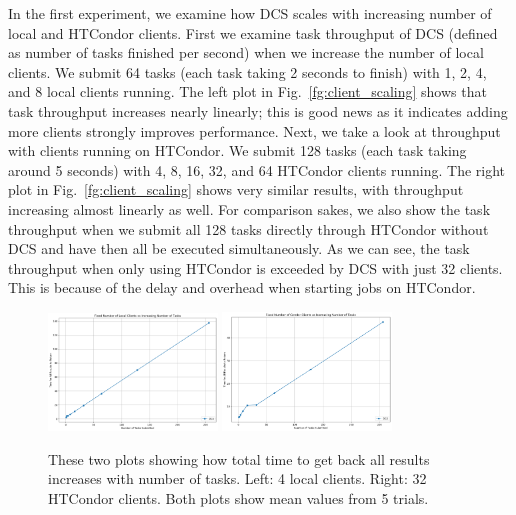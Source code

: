 \documentclass{article}
\begin{document}
In the first experiment, we examine how DCS scales with increasing number of local and HTCondor clients. First we examine task throughput of DCS (defined as number of tasks finished per second) when we increase the number of local clients. We submit 64 tasks (each task taking 2 seconds to finish) with 1, 2, 4, and 8 local clients running. The left plot in Fig.~\ref{fg:client_scaling} shows that task throughput increases nearly linearly; this is good news as it indicates adding more clients strongly improves performance. Next, we take a look at throughput with clients running on HTCondor. We submit 128 tasks (each task taking around 5 seconds) with 4, 8, 16, 32, and 64 HTCondor clients running. The right plot in Fig.~\ref{fg:client_scaling} shows very similar results, with throughput increasing almost linearly as well. For comparison sakes, we also show the task throughput when we submit all 128 tasks directly through HTCondor without DCS and have then all be executed simultaneously. As we can see, the task throughput when only using HTCondor is exceeded by DCS with just 32 clients. This is because of the delay and overhead when starting jobs on HTCondor.

\begin{figure}[t]
  \begin{center}
    \includegraphics[width=0.4\textwidth]{task_scaling_local.png}
    \includegraphics[width=0.4\textwidth]{task_scaling_condor.png}
    \caption{These two plots showing how total time to get back all results increases with number of tasks. Left: 4 local clients. Right: 32 HTCondor clients. Both plots show mean values from 5 trials.}
    \label{fg:task_scaling}
  \end{center}
\end{figure}
\end{document}
